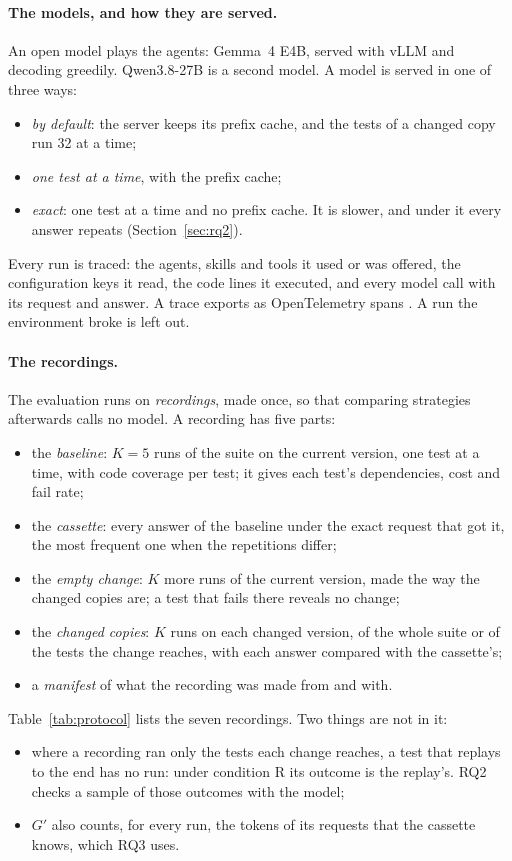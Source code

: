 \documentclass[11pt,a4paper]{article}
\begin{document}
\paragraph{The models, and how they are served.} An open model plays the agents: Gemma~4 E4B, served with vLLM
and decoding greedily. Qwen3.8-27B is a second model. A model is served in one of three ways:
\begin{itemize}
  \item \emph{by default}: the server keeps its prefix cache, and the tests of a changed copy run 32 at a time;
  \item \emph{one test at a time}, with the prefix cache;
  \item \emph{exact}: one test at a time and no prefix cache. It is slower, and under it every answer repeats
        (Section~\ref{sec:rq2}).
\end{itemize}
Every run is traced: the agents, skills and tools it used or was offered, the configuration keys it read, the code
lines it executed, and every model call with its request and answer. A trace exports as OpenTelemetry spans
\cite{otel2026genai}. A run the environment broke is left out.

\paragraph{The recordings.} The evaluation runs on \emph{recordings}, made once, so that comparing strategies
afterwards calls no model. A recording has five parts:
\begin{itemize}
  \item the \emph{baseline}: $K = 5$ runs of the suite on the current version, one test at a time, with code
        coverage per test; it gives each test's dependencies, cost and fail rate;
  \item the \emph{cassette}: every answer of the baseline under the exact request that got it, the most frequent
        one when the repetitions differ;
  \item the \emph{empty change}: $K$ more runs of the current version, made the way the changed copies are; a test
        that fails there reveals no change;
  \item the \emph{changed copies}: $K$ runs on each changed version, of the whole suite or of the tests the change
        reaches, with each answer compared with the cassette's;
  \item a \emph{manifest} of what the recording was made from and with.
\end{itemize}
Table~\ref{tab:protocol} lists the seven recordings. Two things are not in it:
\begin{itemize}
  \item where a recording ran only the tests each change reaches, a test that replays to the end has no run:
        under condition R its outcome is the replay's. RQ2 checks a sample of those outcomes with the model;
  \item $G'$ also counts, for every run, the tokens of its requests that the cassette knows, which RQ3 uses.
\end{itemize}
\end{document}
